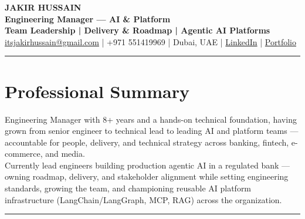 \documentclass[10pt,a4paper]{article}
\newcommand{\NameSize}{\fontsize{22}{24}\selectfont}
\newcommand{\TitleSize}{\fontsize{10.8}{13}\selectfont}
\newcommand{\TagSize}{\fontsize{10}{12}\selectfont}
\newcommand{\BodySize}{\fontsize{9.7}{12}\selectfont}
\newcommand{\SmallBody}{\fontsize{9.2}{11.4}\selectfont}
\newcommand{\topdivider}{\color{rulecolor}\rule{\linewidth}{0.5pt}\color{primary}\vspace{0pt}}
\newcommand{\ATSspaceoff}{\ifdefined\pdfinterwordspaceoff\pdfinterwordspaceoff\fi}
\newcommand{\ATSspaceon}{\ifdefined\pdfinterwordspaceon\pdfinterwordspaceon\fi}
\begin{document}
\BodySize

\begin{center}

{\ATSspaceoff\NameSize \bfseries JAKIR HUSSAIN\ATSspaceon}\\[4pt]
{\TitleSize \bfseries Engineering Manager --- AI \& Platform}\\[2pt]
{\TagSize \bfseries Team Leadership \;|\; Delivery \& Roadmap \;|\; Agentic AI Platforms}\\[6pt]

\href{mailto:itsjakirhussain@gmail.com}{itsjakirhussain@gmail.com} \;|\;
+971 551419969 \;|\;
Dubai, UAE \;|\;
\href{https://linkedin.com/in/iam-hussain}{LinkedIn} \;|\;
\href{https://iam-hussain.site}{Portfolio}

\end{center}
\vspace{-8pt}
\topdivider
\vspace{2pt}
\section*{Professional Summary}
\SmallBody
Engineering Manager with 8+ years and a hands-on technical foundation, having grown from senior engineer to technical lead to leading AI and platform teams — accountable for people, delivery, and technical strategy across banking, fintech, e-commerce, and media.\\[5pt]

Currently lead engineers building production agentic AI in a regulated bank — owning roadmap, delivery, and stakeholder alignment while setting engineering standards, growing the team, and championing reusable AI platform infrastructure (LangChain/LangGraph, MCP, RAG) across the organization.\\[8pt]

\vspace{-8pt}
\topdivider
\vspace{2pt}
\end{document}
